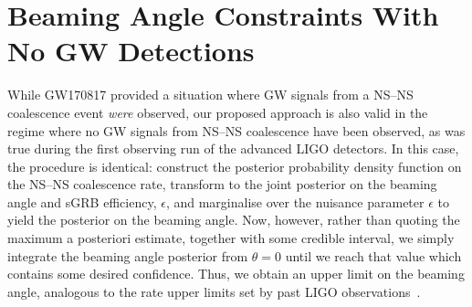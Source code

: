 \documentclass[twocolumn,nofootinbib]{revtex4-1}
\newcommand{\cbcrate}{{{\mathcal R}}}
\newcommand{\BNS}{\ac{NS}--\ac{NS}\xspace}
\newcommand{\arw}[1]{{\color{dgreen}{#1}}}
\begin{document}
%

\section{Beaming Angle Constraints With No \ac{GW} Detections}
\label{sec:beaming_limits}
While GW170817 provided a situation where \ac{GW} signals from a \BNS
coalescence event \emph{were} observed, our proposed approach is also
valid in the regime where no \ac{GW} signals from \BNS coalescence
have been observed, as was true during the first observing run of the
advanced LIGO detectors.  In this case, the procedure is identical:
construct the posterior probability density function on the \BNS
coalescence rate, transform to the joint posterior on the beaming
angle and \ac{sGRB} efficiency, $\epsilon$, and marginalise over the
nuisance parameter $\epsilon$ to yield the posterior on the beaming
angle.  Now, however, rather than quoting the maximum a posteriori
estimate, together with some credible interval, we simply integrate
the beaming angle posterior from $\theta=0$ until we reach that value
which contains some desired confidence.  Thus, we obtain an upper
limit on the beaming angle, analogous to the rate upper limits set by
past LIGO observations~\cite{Colaboration:2011np}.


\end{document}
